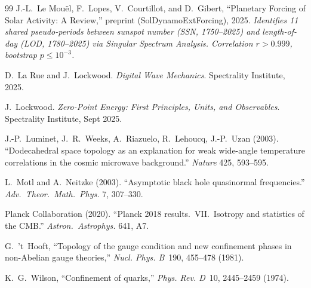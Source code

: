 \begin{thebibliography}{99}
J.-L.~Le Mou\"{e}l, F.~Lopes, V.~Courtillot, and D.~Gibert,
``Planetary Forcing of Solar Activity: A Review,''
preprint (SolDynamoExtForcing), 2025.
\textit{Identifies 11 shared pseudo-periods between sunspot number (SSN, 1750--2025)
and length-of-day (LOD, 1780--2025) via Singular Spectrum Analysis.
Correlation $r > 0.999$, bootstrap $p \leq 10^{-3}$.}

D.~La Rue and J.~Lockwood.
\textit{Digital Wave Mechanics}.
Spectrality Institute, 2025.

J.~Lockwood.
\textit{Zero-Point Energy: First Principles, Units, and Observables}.
Spectrality Institute, Sept 2025.

J.-P.~Luminet, J.~R.~Weeks, A.~Riazuelo, R.~Lehoucq, J.-P.~Uzan (2003).
``Dodecahedral space topology as an explanation for weak wide-angle temperature correlations in the cosmic microwave background.''
\textit{Nature} 425, 593--595.

L.~Motl and A.~Neitzke (2003).
``Asymptotic black hole quasinormal frequencies.''
\textit{Adv.\ Theor.\ Math.\ Phys.} 7, 307--330.

Planck Collaboration (2020).
``Planck 2018 results.\ VII.\ Isotropy and statistics of the CMB.''
\textit{Astron.\ Astrophys.} 641, A7.

G.~'t~Hooft,
``Topology of the gauge condition and new confinement phases in non-Abelian gauge theories,''
\emph{Nucl. Phys. B}\ 190, 455--478 (1981).

K.~G.~Wilson,
``Confinement of quarks,''
\emph{Phys. Rev. D}\ 10, 2445--2459 (1974).



\end{thebibliography}
